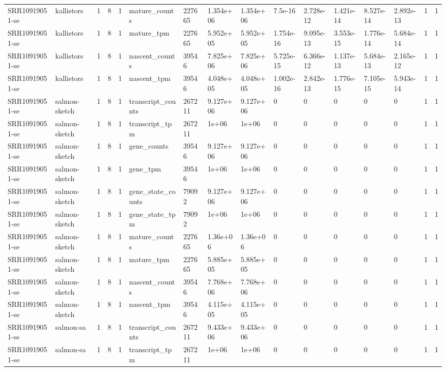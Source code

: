 \begin{tabular}{llllllllllllllll}
SRR10919051-se & kallistors & 1 & 8 & 1 & mature\_counts & 227665 & 1.354e+06 & 1.354e+06 & 7.5e-16 & 2.728e-12 & 1.421e-14 & 8.527e-14 & 2.892e-13 & 1 & 1 \\
SRR10919051-se & kallistors & 1 & 8 & 1 & mature\_tpm & 227665 & 5.952e+05 & 5.952e+05 & 1.754e-16 & 9.095e-13 & 3.553e-15 & 1.776e-14 & 5.684e-14 & 1 & 1 \\
SRR10919051-se & kallistors & 1 & 8 & 1 & nascent\_counts & 39546 & 7.825e+06 & 7.825e+06 & 5.725e-15 & 6.366e-12 & 1.137e-13 & 5.684e-13 & 2.165e-12 & 1 & 1 \\
SRR10919051-se & kallistors & 1 & 8 & 1 & nascent\_tpm & 39546 & 4.048e+05 & 4.048e+05 & 1.002e-16 & 2.842e-13 & 1.776e-15 & 7.105e-15 & 5.943e-14 & 1 & 1 \\
SRR10919051-se & salmon-sketch & 1 & 8 & 1 & transcript\_counts & 267211 & 9.127e+06 & 9.127e+06 & 0 & 0 & 0 & 0 & 0 & 1 & 1 \\
SRR10919051-se & salmon-sketch & 1 & 8 & 1 & transcript\_tpm & 267211 & 1e+06 & 1e+06 & 0 & 0 & 0 & 0 & 0 & 1 & 1 \\
SRR10919051-se & salmon-sketch & 1 & 8 & 1 & gene\_counts & 39546 & 9.127e+06 & 9.127e+06 & 0 & 0 & 0 & 0 & 0 & 1 & 1 \\
SRR10919051-se & salmon-sketch & 1 & 8 & 1 & gene\_tpm & 39546 & 1e+06 & 1e+06 & 0 & 0 & 0 & 0 & 0 & 1 & 1 \\
SRR10919051-se & salmon-sketch & 1 & 8 & 1 & gene\_state\_counts & 79092 & 9.127e+06 & 9.127e+06 & 0 & 0 & 0 & 0 & 0 & 1 & 1 \\
SRR10919051-se & salmon-sketch & 1 & 8 & 1 & gene\_state\_tpm & 79092 & 1e+06 & 1e+06 & 0 & 0 & 0 & 0 & 0 & 1 & 1 \\
SRR10919051-se & salmon-sketch & 1 & 8 & 1 & mature\_counts & 227665 & 1.36e+06 & 1.36e+06 & 0 & 0 & 0 & 0 & 0 & 1 & 1 \\
SRR10919051-se & salmon-sketch & 1 & 8 & 1 & mature\_tpm & 227665 & 5.885e+05 & 5.885e+05 & 0 & 0 & 0 & 0 & 0 & 1 & 1 \\
SRR10919051-se & salmon-sketch & 1 & 8 & 1 & nascent\_counts & 39546 & 7.768e+06 & 7.768e+06 & 0 & 0 & 0 & 0 & 0 & 1 & 1 \\
SRR10919051-se & salmon-sketch & 1 & 8 & 1 & nascent\_tpm & 39546 & 4.115e+05 & 4.115e+05 & 0 & 0 & 0 & 0 & 0 & 1 & 1 \\
SRR10919051-se & salmon-sa & 1 & 8 & 1 & transcript\_counts & 267211 & 9.433e+06 & 9.433e+06 & 0 & 0 & 0 & 0 & 0 & 1 & 1 \\
SRR10919051-se & salmon-sa & 1 & 8 & 1 & transcript\_tpm & 267211 & 1e+06 & 1e+06 & 0 & 0 & 0 & 0 & 0 & 1 & 1 \\

\end{tabular}

